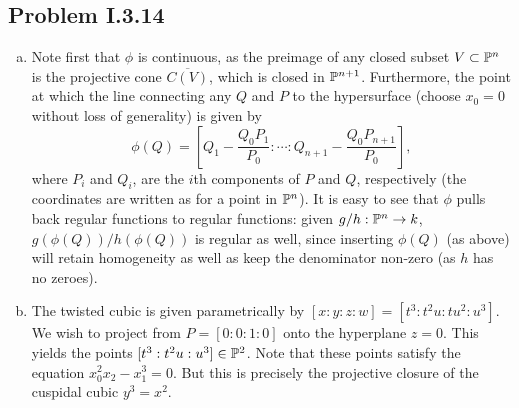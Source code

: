 \documentclass{mathnotes}
\begin{document}
\subsection*{Problem I.3.14}
\begin{enumerate}[(a)]
    \item Note first that $\phi$ is continuous, as the preimage of any closed subset $V\subset \mathbb{P}^n$
        is the projective cone $\overline{C(V)}$, which is closed in $\mathbb{P}^{n+1}$. 
        Furthermore, the point at which the line connecting any $Q$ and $P$ to the hypersurface
        (choose $x_0=0$ without loss of generality) is given by 
        \[\phi(Q)=[Q_1-\frac{Q_0P_1}{P_0}:\cdots:Q_{n+1}-\frac{Q_0P_{n+1}}{P_0}],\]
        where $P_i$ and $Q_i$, are the $i$th components of $P$ and $Q$, respectively (the coordinates
        are written as for a point in $\mathbb{P}^n$).
        It is easy to see that $\phi$
        pulls back regular functions to regular functions: given $g/h:\mathbb{P}^n\to k$, $g(\phi(Q))/h(\phi(Q))$
        is regular as well, since inserting $\phi(Q)$ (as above) will retain homogeneity as well as
        keep the denominator non-zero (as $h$ has no zeroes).
    \item The twisted cubic is given parametrically by $[x:y:z:w]=[t^3:t^2u:tu^2:u^3]$. We wish
        to project from $P=[0:0:1:0]$ onto the hyperplane $z=0$. This yields the points
        $[t^3:t^2u:u^3]\in\mathbb{P}^2$. Note that these points satisfy the equation $x_0^2x_2-x_1^3=0$.
        But this is precisely the projective closure of the cuspidal cubic $y^3=x^2$.
\end{enumerate}
\end{document}
